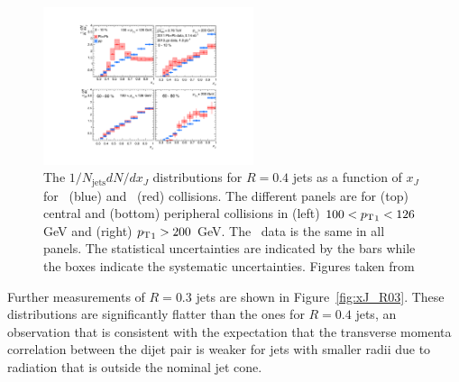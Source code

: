 \begin{figure}[htbp]
\begin{center}
\includegraphics[width=0.55\textwidth]{figures/jetMeasurements/xJ}
\caption{The $1/N_\mathrm{jets} dN/dx_J$ distributions for $R=0.4$ jets as a function of $x_J$ for \pp\ (blue) and \pbpb\ (red) collisions. The different panels are for (top) central and (bottom) peripheral collisions in (left) $100 < \mbox{$p_{\mathrm{T}}$}_1 < 126$ GeV and (right) $\mbox{$p_{\mathrm{T}}$}_1 > 200 $ GeV. The \pp\ data is the same in all panels. The statistical uncertainties are indicated by the bars while the boxes indicate the systematic uncertainties. Figures taken from \cite{Aaboud:2017eww}}
\label{fig:xJ}
\end{center}
\end{figure}

Further measurements of $R = 0.3$ jets are shown in Figure~\ref{fig:xJ_R03}. These distributions are significantly flatter than the ones for $R=0.4$ jets, an observation that is consistent with the expectation that the transverse momenta correlation between the dijet pair is weaker for jets with smaller radii due to radiation that is outside the nominal jet cone.


